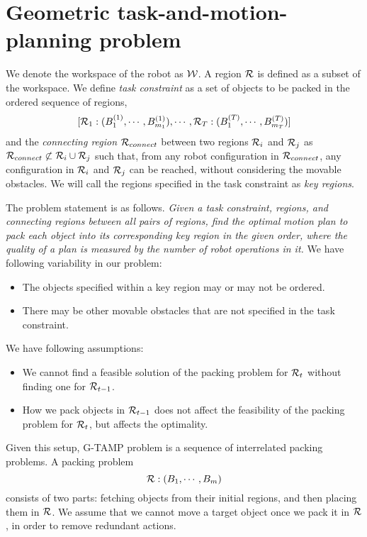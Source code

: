 \documentclass[10pt,letterpaper]{article}
\begin{document}
\section{Geometric task-and-motion-planning problem}
We denote the workspace of the robot as $\mathcal{W}$. A region $\mathcal{R}$ is
defined as a subset of the workspace. We define \emph{task constraint} as a set of objects 
 to be packed in the ordered sequence of regions,
$$[\mathcal{R}_1:(B^{(1)}_1,\cdots,B^{(1)}_{m_1}), \cdots, 
\mathcal{R}_T:(B^{(T)}_1,\cdots,B^{(T)}_{m_T})]$$ and the \emph{connecting region}
$\mathcal{R}_{connect}$ between two regions $\mathcal{R}_i$ and $\mathcal{R}_j$ as
$\mathcal{R}_{connect} \not\subset \mathcal{R}_i \cup \mathcal{R}_j$ such that,
 from any robot configuration in $\mathcal{R}_{connect}$, any configuration
in  $\mathcal{R}_i$ and $\mathcal{R}_j$ can be reached, 
without considering the movable obstacles. We will call the regions
specified in the task constraint as \emph{key regions}.


The problem statement is as follows. \emph{Given a task constraint, regions, and connecting 
regions between all pairs of regions, find the optimal motion plan to 
pack each object into its corresponding
key region in the given order, where the quality of a plan is measured by the number of
robot operations in it.}  We have following variability in our problem:
\begin{itemize}
\item The objects specified within a key region may or may not be ordered.
\item There may be other movable obstacles that are not specified in the task constraint.
\end{itemize}
We have following assumptions:
\begin{itemize}
\item We cannot find a feasible solution of the packing problem for $\mathcal{R}_{t}$ without
finding one for $\mathcal{R}_{t-1}$.
\item How we pack objects in $\mathcal{R}_{t-1}$ does not affect the
feasibility of the packing problem for $\mathcal{R}_{t}$, but affects the optimality.
\end{itemize}

Given this setup, G-TAMP problem is a sequence of interrelated packing problems. 
A packing problem
$$\mathcal{R}: (B_1,\cdots,B_{m})$$
consists of two parts: fetching objects from their initial regions, and
then placing them in $\mathcal{R}$. We assume that we cannot move a target
object once we pack it in $\mathcal{R}$, in order to remove redundant actions.
\end{document}
